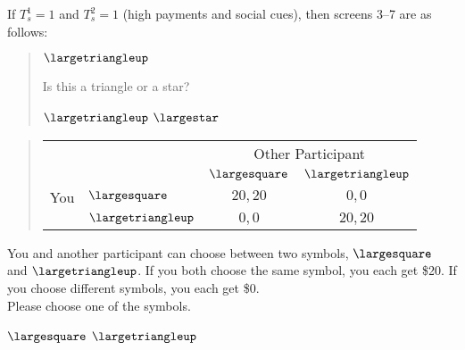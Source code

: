 \documentclass[11pt]{article}
\begin{document}
If $T_s^1=1$ and $T_s^2=1$ (high payments and social cues), then screens 3--7 are as follows:
\begin{tcolorbox}
\begin{quote}
\begin{center}
{\Huge $\largetriangleup$}
\end{center}
 \centering Is this a triangle or a star?

 \begin{center}
$\largetriangleup$ \qquad $\largestar$
\end{center}
\end{quote}

\begin{quote}
\begin{center}
\begin{tabular}{llcc}
    & & \multicolumn{2}{c}{Other Participant}  \\
  &  & $\largesquare$ & $\largetriangleup$  \\ \cline{3-4}
 You & $\largesquare$ & \multicolumn{1}{|c|}{$20,20$} & \multicolumn{1}{c|}{$0,0$}  \\ \cline{3-4}
  & $\largetriangleup$ & \multicolumn{1}{|c|}{$0,0$} & \multicolumn{1}{c|}{$20,20$}  \\ \cline{3-4}
\end{tabular}
\end{center}
\end{quote}

You and another participant can choose between two symbols, $\largesquare$ and $\largetriangleup$. If you both choose the same symbol, you each get \$20. If you choose different symbols, you each get \$0.\\

Please choose one of the symbols.\\

\begin{center}
$\largesquare$ \qquad $\largetriangleup$
\end{center}
\end{tcolorbox}
\end{document}
